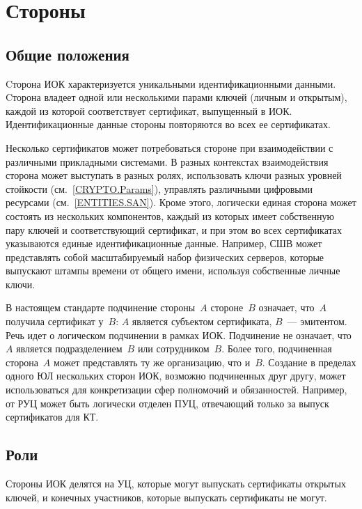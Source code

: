 \chapter{Стороны}\label{ENTITIES}

\section{Общие положения}

Cторона ИОК характеризуется уникальными идентификационными данными.
%
Cторона владеет одной или несколькими парами ключей (личным и открытым),
каждой из которой соответствует сертификат, выпущенный в ИОК. 
%
Идентификационные данные стороны повторяются во всех ее сертификатах.
%

Несколько сертификатов может потребоваться стороне при взаимодействии 
с различными прикладными системами. В разных контекстах взаимодействия
сторона может выступать в разных ролях, 
использовать ключи разных уровней стойкости (см.~\ref{CRYPTO.Params}), 
управлять различными цифровыми ресурсами (см.~\ref{ENTITIES.SAN}). 
%
Кроме этого, логически единая сторона может состоять из нескольких 
компонентов, каждый из которых имеет собственную пару ключей 
и соответствующий сертификат, и при этом во всех сертификатах указываются 
единые идентификационные данные.
%
Например, СШВ может представлять собой масштабируемый набор физических серверов, 
которые выпускают штампы времени от общего имени, используя собственные личные ключи.

В настоящем стандарте
подчинение стороны~$A$ стороне~$B$ означает, что~$A$ получила сертификат 
у~$B$: $A$ является субъектом сертификата, $B$~--- эмитентом.
%
Речь идет о логическом подчинении в рамках ИОК.
Подчинение не означает, что~$A$ является подразделением~$B$ или сотрудником~$B$. 
Более того, подчиненная сторона~$A$ может представлять ту же организацию, 
что и~$B$.
%
Создание в пределах одного ЮЛ нескольких сторон ИОК, 
возможно подчиненных друг другу, может использоваться для конкретизации 
сфер полномочий и обязанностей.
%
Например, от РУЦ может быть логически отделен ПУЦ, 
отвечающий только за выпуск сертификатов для КТ.

\section{Роли}

Стороны ИОК делятся на УЦ, которые могут выпускать сертификаты открытых ключей, 
и конечных участников, которые выпускать сертификаты не могут.

